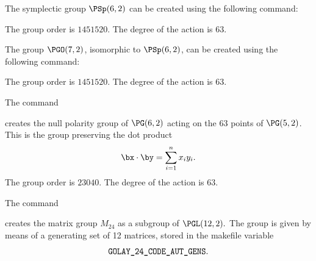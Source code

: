 \bigskip





The symplectic group $\PSp(6,2)$ can be created using the following command: 


The group order is $1451520$. 
The degree of the action is $63$.


\bigskip

The group $\PGO(7,2)$, isomorphic to $\PSp(6,2)$, 
can be created using the following command: 


The group order is $1451520$. The degree of the action is $63$.


\bigskip

The command 


creates the null polarity group of $\PG(6,2)$ 
acting on the 63 points of $\PG(5,2)$. 
This is the group preserving the 
dot product
$$
\bx \cdot \by = \sum_{i=1}^n x_i y_i.
$$
The group order is $23040$. 
The degree of the action is $63$.


\bigskip


The command 


creates the matrix group $M_{24}$ as a subgroup of $\PGL(12,2).$ 
The group is given by means of a generating set of 12 matrices, 
stored in the makefile variable 
$$
\verb'GOLAY_24_CODE_AUT_GENS'.
$$




\bigskip



